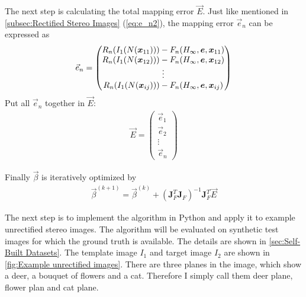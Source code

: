 The next step is calculating the total mapping error $\vec{E}$. Just like mentioned in \cref{subsec:Rectified Stereo Images} (\cref{eq:e_n2}), the mapping error $\vec{e}_n$ can be expressed as
\begin{align}
\vec{e}_{n} = \begin{pmatrix} 
	R_n(I_1(N(\boldsymbol{x}_{11})))-F_n(H_\infty, \boldsymbol{e}, \boldsymbol{x}_{11})\\
	R_n(I_1(N(\boldsymbol{x}_{12})))-F_n(H_\infty, \boldsymbol{e}, \boldsymbol{x}_{12})\\
	\vdots\\
	R_n(I_1(N(\boldsymbol{x}_{ij})))-F_n(H_\infty, \boldsymbol{e}, \boldsymbol{x}_{ij})
\end{pmatrix}
\end{align}
Put all $\vec{e}_{n}$ together in $\vec{E}$:
\begin{align}
	\vec{E} = \begin{pmatrix} 
	\vec{e}_{1}\\
	\vec{e}_{2}\\
	\vdots\\
	\vec{e}_{n}
	\end{pmatrix}
\end{align}

Finally $\vec{\beta}$ is iteratively optimized by 
\begin{align}
	\vec{\beta}^{(k+1)} = \vec{\beta}^{(k)} + \left(\mathbf{J}_{F}^{T} \mathbf{J}_{F} \right)^{-1} \mathbf{J}_{F}^{T} \vec{E}
\end{align}

The next step is to implement the algorithm in Python and apply it to example unrectified stereo images. The algorithm will be evaluated on synthetic test images for which the ground truth is available. The details are shown in \cref{sec:Self-Built Datasets}. The template image $I_1$ and target image $I_2$ are shown in \cref{fig:Example unrectified images}. There are three planes in the image, which show a deer, a bouquet of flowers and a cat. Therefore I simply call them deer plane, flower plan and cat plane. 

